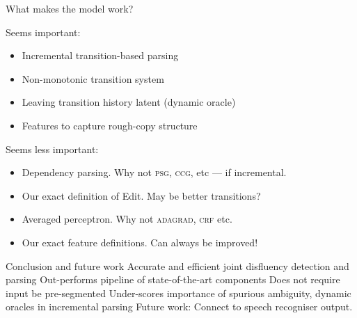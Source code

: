 \documentclass[color=usenames,dvipsnames]{lecture}
\begin{document}
\begin{points}{What makes the model work?}

\p Seems important:\\
\begin{itemize}
\item Incremental transition-based parsing
\item Non-monotonic transition system
\item Leaving transition history latent (dynamic oracle)
\item Features to capture rough-copy structure
\end{itemize}
\p Seems less important:\\
\begin{itemize}
\item Dependency parsing. Why not \textsc{psg}, \textsc{ccg}, etc --- if incremental.
\item Our exact definition of Edit. May be better transitions?
\item Averaged perceptron. Why not \textsc{adagrad}, \textsc{crf} etc.
\item Our exact feature definitions. Can always be improved!
\end{itemize}
\end{points}

\begin{points}{Conclusion and future work}
\p Accurate and efficient joint disfluency detection and parsing
\p Out-performs pipeline of state-of-the-art components
\p Does not require input be pre-segmented
\p Under-scores importance of spurious ambiguity, dynamic oracles in
   incremental parsing
\p Future work: Connect to speech recogniser output.
\end{points}
\end{document}
